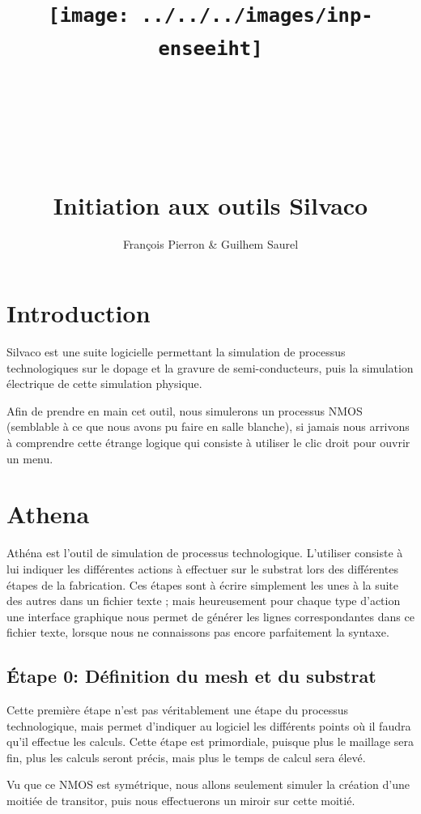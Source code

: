 \documentclass{article}
\title{\texttt{[image: ../../../images/inp-enseeiht]} \\ ~ \\ ~ \\ ~ \\ ~ \\ Initiation aux outils Silvaco}
\author{François Pierron \& Guilhem Saurel}
\date{\oldstylenums{24 javier 2014}}
\begin{document}
\begin{titlepage}
    \setcounter{page}{0}
    \maketitle
    \vfill
    \tableofcontents
    \thispagestyle{empty}
\end{titlepage}

\section*{Introduction}

Silvaco est une suite logicielle permettant la simulation de processus technologiques sur le dopage et la gravure de semi-conducteurs, puis la simulation électrique de cette simulation physique.

Afin de prendre en main cet outil, nous simulerons un processus NMOS (semblable à ce que nous avons pu faire en salle blanche), si jamais nous arrivons à comprendre cette étrange logique qui consiste à utiliser le clic droit pour ouvrir un menu.

\section{Athena}

Athéna est l’outil de simulation de processus technologique. L’utiliser consiste à lui indiquer les différentes actions à effectuer sur le substrat lors des différentes étapes de la fabrication.
Ces étapes sont à écrire simplement les unes à la suite des autres dans un fichier texte ; mais heureusement pour chaque type d’action une interface graphique nous permet de générer les lignes correspondantes dans ce fichier texte, lorsque nous ne connaissons pas encore parfaitement la syntaxe.

\subsection{Étape 0: Définition du mesh et du substrat}
Cette première étape n’est pas véritablement une étape du processus technologique, mais permet d’indiquer au logiciel les différents points où il faudra qu’il effectue les calculs.
Cette étape est primordiale, puisque plus le maillage sera fin, plus les calculs seront précis, mais plus le temps de calcul sera élevé.

Vu que ce NMOS est symétrique, nous allons seulement simuler la création d’une moitiée de transitor, puis nous effectuerons un miroir sur cette moitié.
\end{document}
